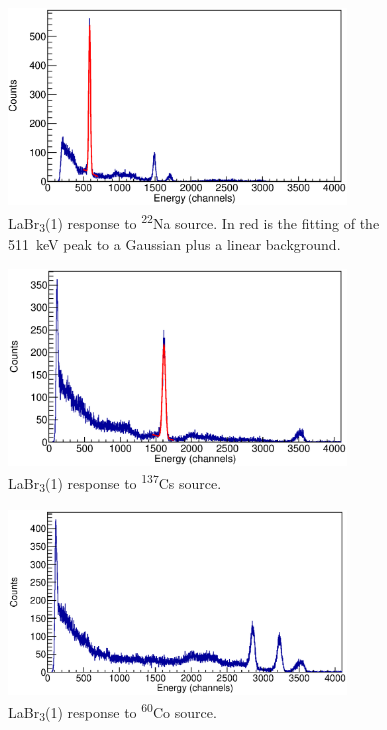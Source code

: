 \documentclass[a4paper,12pt]{report}
\newcommand{\Na}{\textsuperscript{22}Na }
\begin{document}
\begin{figure}[H]
	\centering
	\includegraphics[width=0.80\textwidth]{labr_na22_calibration.eps}
	\caption{LaBr\textsubscript{3}(1) response to \Na source. In red is the fitting of the \qty{511}{\keV} peak to a Gaussian plus a linear background.}
	\label{labr_na22_calibration}
\end{figure}

\begin{figure}[H]
	\centering
	\includegraphics[width=0.80\textwidth]{labr_cs137_calibration.eps}
	\caption{LaBr\textsubscript{3}(1) response to \textsuperscript{137}Cs source.}
	\label{labr_cs137_calibration}
\end{figure}

\begin{figure}[H]
	\centering
	\includegraphics[width=0.80\textwidth]{labr_co60_calibration.eps}
	\caption{LaBr\textsubscript{3}(1) response to \textsuperscript{60}Co source.}
	\label{labr_co60_calibration}
\end{figure}
\end{document}
